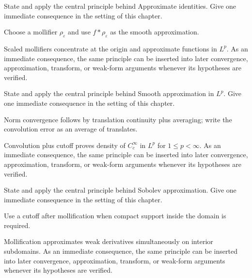 \begin{exercise}\label{exr:iii22-02}
State and apply the central principle behind Approximate identities. Give one immediate consequence in the setting of this chapter.
\end{exercise}
\begin{hint}
Choose a mollifier \(\rho_\varepsilon\) and use \(f*\rho_\varepsilon\) as the smooth approximation.
\end{hint}
\begin{solution}
Scaled mollifiers concentrate at the origin and approximate functions in $L^p$. As an immediate consequence, the same principle can be inserted into later convergence, approximation, transform, or weak-form arguments whenever its hypotheses are verified.
\end{solution}

\begin{exercise}\label{exr:iii22-03}
State and apply the central principle behind Smooth approximation in $L^p$. Give one immediate consequence in the setting of this chapter.
\end{exercise}
\begin{hint}
Norm convergence follows by translation continuity plus averaging; write the convolution error as an average of translates.
\end{hint}
\begin{solution}
Convolution plus cutoff proves density of $C_c^\infty$ in $L^p$ for $1\le p<\infty$. As an immediate consequence, the same principle can be inserted into later convergence, approximation, transform, or weak-form arguments whenever its hypotheses are verified.
\end{solution}

\begin{exercise}\label{exr:iii22-04}
State and apply the central principle behind Sobolev approximation. Give one immediate consequence in the setting of this chapter.
\end{exercise}
\begin{hint}
Use a cutoff after mollification when compact support inside the domain is required.
\end{hint}
\begin{solution}
Mollification approximates weak derivatives simultaneously on interior subdomains. As an immediate consequence, the same principle can be inserted into later convergence, approximation, transform, or weak-form arguments whenever its hypotheses are verified.
\end{solution}


